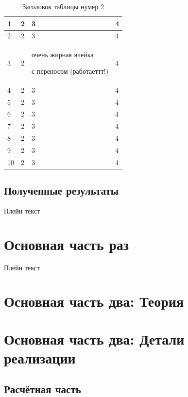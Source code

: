 \documentclass[a4paper,article,14pt]{extarticle}
\begin{document}
\begin{center}
    \begin{longtable}{|p{2cm}||p{3cm}|p{7cm}|p{3cm}|}
    \caption{Заголовок таблицы нумер 2}\\
    \hline
    1 & 2 & 3 & 4\\ 
    \hline
    2 & 2 & 3 & 4\\
    \hline
    3 & 2 & очень жирная ячейка \par с переносом (работаеттт!) & 4\\
    \hline
    4 & 2 & 3 & 4\\
    \hline
    5 & 2 & 3 & 4\\
    \hline
    6 & 2 & 3 & 4\\
    \hline
    7 & 2 & 3 & 4\\
    \hline
    8 & 2 & 3 & 4\\
    \hline
    9 & 2 & 3 & 4\\
    \hline
    10 & 2 & 3 & 4\\
    \hline
    
    
    \end{longtable}
\end{center}


\subsection{Полученные результаты}

Плейн текст

\section{Основная часть раз}

Плейн текст

\pagebreak
\section{Основная часть два: Теория}


\section{Основная часть два: Детали реализации}
\subsection{Расчётная часть}
\end{document}
